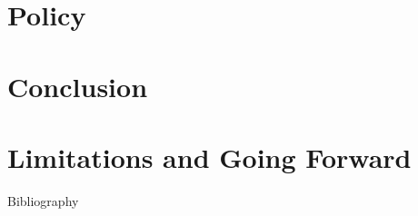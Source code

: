 \documentclass{beamer}
\begin{document}
\section{Policy}


\section{Conclusion}

\section{Limitations and Going Forward}




\begin{frame}[allowframebreaks]{Bibliography}
    \printbibliography
\end{frame}
\end{document}
